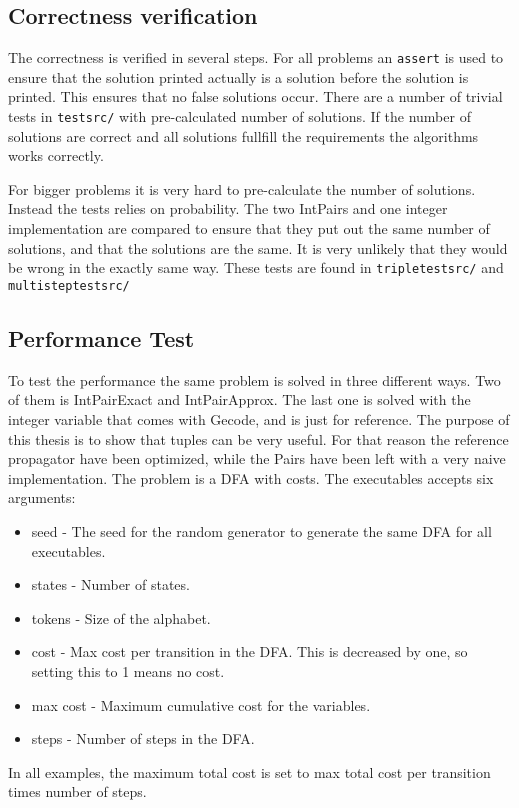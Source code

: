 \documentclass[a4paper,11pt]{article}
\begin{document}
\subsection{Correctness verification}
The correctness is verified in several steps. For all problems an \texttt{assert} is used to ensure that the solution printed actually is a solution before the solution is printed. This ensures that no false solutions occur. There are a number of trivial tests in \texttt{testsrc/} with pre-calculated number of solutions. If the number of solutions are correct and all solutions fullfill the requirements the algorithms works correctly.

For bigger problems it is very hard to pre-calculate the number of solutions. Instead the tests relies on probability. The two IntPairs and one integer implementation are compared to ensure that they put out the same number of solutions, and that the solutions are the same. It is very unlikely that they would be wrong in the exactly same way. These tests are found in \texttt{tripletestsrc/} and \texttt{multisteptestsrc/}

\subsection{Performance Test}
To test the performance the same problem is solved in three different ways. Two of them is IntPairExact and IntPairApprox. The last one is solved with the integer variable that comes with Gecode, and is just for reference. The purpose of this thesis is to show that tuples can be very useful. For that reason the reference propagator have been optimized, while the Pairs have been left with a very naive implementation. The problem is a DFA with costs. The executables accepts six arguments: 
\begin{itemize}
\item{seed} - The seed for the random generator to generate the same DFA for all executables.
\item{states} - Number of states.
\item{tokens} - Size of the alphabet.
\item{cost} - Max cost per transition in the DFA. This is decreased by one, so setting this to 1 means no cost.
\item{max cost} - Maximum cumulative cost for the variables.
\item{steps} - Number of steps in the DFA.
\end{itemize}
In all examples, the maximum total cost is set to max total cost per transition times number of steps.
\end{document}
